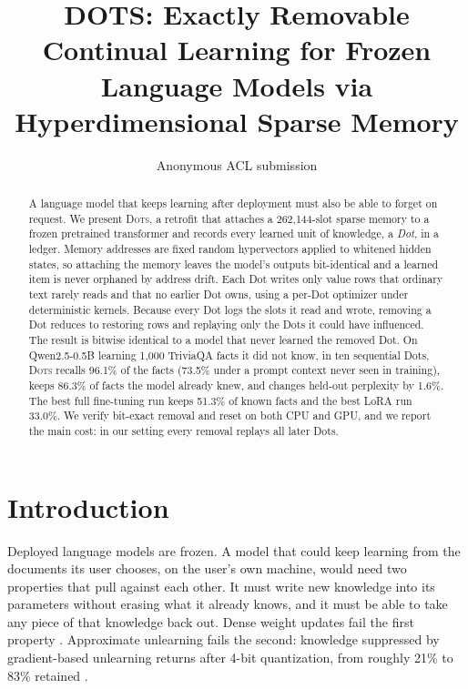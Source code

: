 \documentclass[11pt]{article}
\title{DOTS: Exactly Removable Continual Learning for Frozen Language Models via Hyperdimensional Sparse Memory}
\author{Anonymous ACL submission}
\newcommand{\sys}{\textsc{Dots}}
\begin{document}
\maketitle
\begin{abstract}
A language model that keeps learning after deployment must also be able to forget on request. We present \sys{}, a retrofit that attaches a 262{,}144-slot sparse memory to a frozen pretrained transformer and records every learned unit of knowledge, a \emph{Dot}, in a ledger. Memory addresses are fixed random hypervectors applied to whitened hidden states, so attaching the memory leaves the model's outputs bit-identical and a learned item is never orphaned by address drift. Each Dot writes only value rows that ordinary text rarely reads and that no earlier Dot owns, using a per-Dot optimizer under deterministic kernels. Because every Dot logs the slots it read and wrote, removing a Dot reduces to restoring rows and replaying only the Dots it could have influenced. The result is bitwise identical to a model that never learned the removed Dot. On Qwen2.5-0.5B learning 1{,}000 TriviaQA facts it did not know, in ten sequential Dots, \sys{} recalls 96.1\% of the facts (73.5\% under a prompt context never seen in training), keeps 86.3\% of facts the model already knew, and changes held-out perplexity by 1.6\%. The best full fine-tuning run keeps 51.3\% of known facts and the best LoRA run 33.0\%. We verify bit-exact removal and reset on both CPU and GPU, and we report the main cost: in our setting every removal replays all later Dots.
\end{abstract}



\section{Introduction}

Deployed language models are frozen. A model that could keep learning from the documents its user chooses, on the user's own machine, would need two properties that pull against each other. It must write new knowledge into its parameters without erasing what it already knows, and it must be able to take any piece of that knowledge back out. Dense weight updates fail the first property \citep{mccloskey1989,kirkpatrick2017ewc,ibrahim2024simple}. Approximate unlearning fails the second: knowledge suppressed by gradient-based unlearning returns after 4-bit quantization, from roughly 21\% to 83\% retained \citep{zhang2025quant}.
\end{document}

